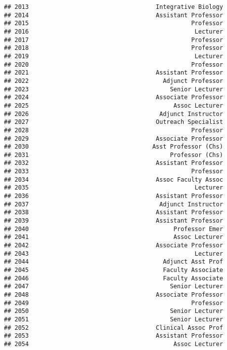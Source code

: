 \documentclass[
]{article}
\begin{document}
\begin{verbatim}
## 2013                                    Integrative Biology
## 2014                                    Assistant Professor
## 2015                                              Professor
## 2016                                               Lecturer
## 2017                                              Professor
## 2018                                              Professor
## 2019                                               Lecturer
## 2020                                              Professor
## 2021                                    Assistant Professor
## 2022                                      Adjunct Professor
## 2023                                        Senior Lecturer
## 2024                                    Associate Professor
## 2025                                         Assoc Lecturer
## 2026                                     Adjunct Instructor
## 2027                                    Outreach Specialist
## 2028                                              Professor
## 2029                                    Associate Professor
## 2030                                   Asst Professor (Chs)
## 2031                                        Professor (Chs)
## 2032                                    Assistant Professor
## 2033                                              Professor
## 2034                                    Assoc Faculty Assoc
## 2035                                               Lecturer
## 2036                                    Assistant Professor
## 2037                                     Adjunct Instructor
## 2038                                    Assistant Professor
## 2039                                    Assistant Professor
## 2040                                         Professor Emer
## 2041                                         Assoc Lecturer
## 2042                                    Associate Professor
## 2043                                               Lecturer
## 2044                                      Adjunct Asst Prof
## 2045                                      Faculty Associate
## 2046                                      Faculty Associate
## 2047                                        Senior Lecturer
## 2048                                    Associate Professor
## 2049                                              Professor
## 2050                                        Senior Lecturer
## 2051                                        Senior Lecturer
## 2052                                    Clinical Assoc Prof
## 2053                                    Assistant Professor
## 2054                                         Assoc Lecturer

\end{verbatim}
\end{document}
